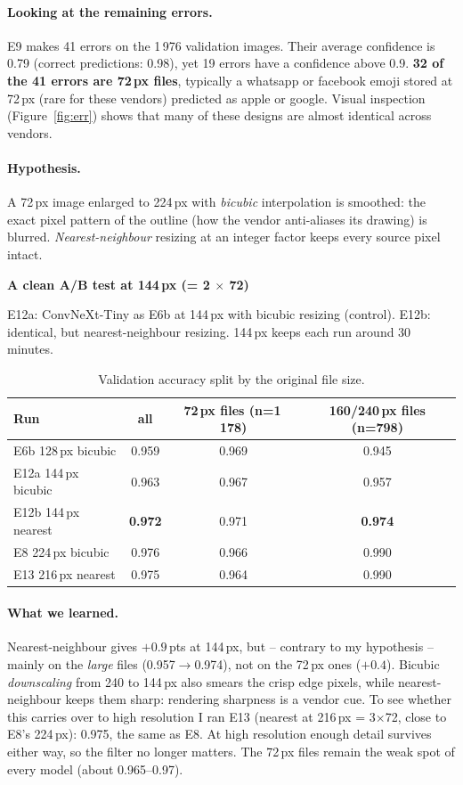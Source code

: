 \documentclass[11pt,a4paper]{article}
\newcommand{\pt}{\,pts}
\newenvironment{stepbox}[1]{\par\medskip\noindent\textbf{#1}\par\nopagebreak}{\par}
\begin{document}
\paragraph{Looking at the remaining errors.} E9 makes 41 errors on the 1\,976 validation images. Their
average confidence is 0.79 (correct predictions: 0.98), yet 19 errors have a confidence above 0.9.
\textbf{32 of the 41 errors are 72\,px files}, typically a whatsapp or facebook emoji stored at 72\,px
(rare for these vendors) predicted as apple or google. Visual inspection (Figure~\ref{fig:err}) shows
that many of these designs are almost identical across vendors.

\paragraph{Hypothesis.} A 72\,px image enlarged to 224\,px with \emph{bicubic} interpolation is smoothed:
the exact pixel pattern of the outline (how the vendor anti-aliases its drawing) is blurred.
\emph{Nearest-neighbour} resizing at an integer factor keeps every source pixel intact.

\begin{stepbox}{A clean A/B test at 144\,px (= 2 $\times$ 72)}
E12a: ConvNeXt-Tiny as E6b at 144\,px with bicubic resizing (control). E12b: identical, but
nearest-neighbour resizing. 144\,px keeps each run around 30 minutes.
\end{stepbox}

\begin{table}[H]
\centering\small
\begin{tabular}{lccc}
\toprule
Run & all & 72\,px files (n=1\,178) & 160/240\,px files (n=798) \\
\midrule
E6b  128\,px bicubic & 0.959 & 0.969 & 0.945 \\
E12a 144\,px bicubic & 0.963 & 0.967 & 0.957 \\
E12b 144\,px nearest & \textbf{0.972} & 0.971 & \textbf{0.974} \\
E8   224\,px bicubic & 0.976 & 0.966 & 0.990 \\
E13  216\,px nearest & 0.975 & 0.964 & 0.990 \\
\bottomrule
\end{tabular}
\caption{Validation accuracy split by the original file size.}
\end{table}

\paragraph{What we learned.} Nearest-neighbour gives $+0.9$\pt{} at 144\,px, but -- contrary to my
hypothesis -- mainly on the \emph{large} files (0.957$\to$0.974), not on the 72\,px ones ($+0.4$).
Bicubic \emph{downscaling} from 240 to 144\,px also smears the crisp edge pixels, while
nearest-neighbour keeps them sharp: rendering sharpness is a vendor cue. To see whether this
carries over to high resolution I ran E13 (nearest at 216\,px = 3$\times$72, close to E8's 224\,px):
0.975, the same as E8. At high resolution enough detail survives either way, so the filter no longer
matters. The 72\,px files remain the weak spot of every model (about 0.965--0.97).
\end{document}
